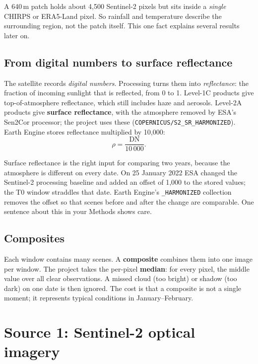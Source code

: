\begin{plainwords}
A 640\,m patch holds about 4,500 Sentinel-2 pixels but sits inside a \emph{single} CHIRPS or ERA5-Land pixel. So rainfall and temperature describe the surrounding region, not the patch itself. This one fact explains several results later on.
\end{plainwords}

\subsection{From digital numbers to surface reflectance}

The satellite records \emph{digital numbers}. Processing turns them into \emph{reflectance}: the fraction of incoming sunlight that is reflected, from 0 to 1. Level-1C products give top-of-atmosphere reflectance, which still includes haze and aerosols. Level-2A products give \textbf{surface reflectance}, with the atmosphere removed by ESA's Sen2Cor processor; the project uses these (\texttt{COPERNICUS/S2\_SR\_HARMONIZED}). Earth Engine stores reflectance multiplied by 10,000:
\begin{equation}
\rho = \frac{\mathrm{DN}}{10\,000}.
\end{equation}

\begin{whybox}
Surface reflectance is the right input for comparing two years, because the atmosphere is different on every date. On 25 January 2022 ESA changed the Sentinel-2 processing baseline and added an offset of 1,000 to the stored values; the T0 window straddles that date. Earth Engine's \texttt{\_HARMONIZED} collection removes the offset so that scenes before and after the change are comparable. One sentence about this in your Methods shows care.
\end{whybox}

\subsection{Composites}

Each window contains many scenes. A \textbf{composite} combines them into one image per window. The project takes the per-pixel \textbf{median}: for every pixel, the middle value over all clear observations. A missed cloud (too bright) or shadow (too dark) on one date is then ignored. The cost is that a composite is not a single moment; it represents typical conditions in January--February.

\section{Source 1: Sentinel-2 optical imagery}

